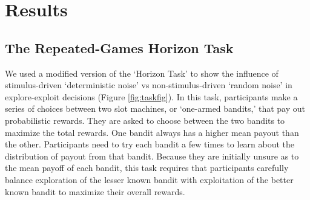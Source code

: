 \documentclass[12pt]{article}
\begin{document}
{	\section*{Results}	
	\subsection*{The Repeated-Games Horizon Task}
	We used a modified version of the `Horizon Task' \citep{wilson2014} to show the influence of stimulus-driven `deterministic noise' vs non-stimulus-driven `random noise' in explore-exploit decisions (Figure \ref{fig:taskfig}). In this task, participants make a series of choices between two slot machines, or `one-armed bandits,' that pay out probabilistic rewards. They are asked to choose between the two bandits to maximize the total rewards. One bandit always has a higher mean payout than the other. Participants need to try each bandit a few times to learn about the distribution of payout from that bandit. Because they are initially unsure as to the mean payoff of each bandit, this task requires that participants carefully balance exploration of the lesser known bandit with exploitation of the better known bandit to maximize their overall rewards. 
	
}
\end{document}
